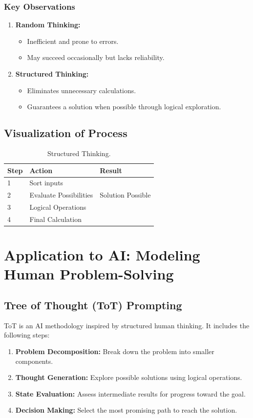 \documentclass[12pt, a4paper]{article}
\begin{document}
\subsubsection{Key Observations}
\begin{enumerate}
    \item \textbf{Random Thinking:}
    \begin{itemize}
        \item Inefficient and prone to errors.
        \item May succeed occasionally but lacks reliability.
    \end{itemize}
    \item \textbf{Structured Thinking:}\begin{itemize}
        \item Eliminates unnecessary calculations.
        \item Guarantees a solution when possible through logical exploration.
    \end{itemize}
\end{enumerate}
\subsection*{Visualization of Process}
\begin{table}[H]
\centering
\begin{tabular}{|l|l|l|}
\hline
Step & Action                 & Result            \\ \hline
1    & Sort inputs            &                   \\ \hline
2    & Evaluate Possibilities & Solution Possible \\ \hline
3    & Logical Operations     &                   \\ \hline
4    & Final Calculation      &                   \\ \hline
\end{tabular}
\caption{Structured Thinking.}
    \label{tab:Thinking procedure}
\end{table}
\section{Application to AI: Modeling Human Problem-Solving}
\subsection{Tree of Thought (ToT) Prompting}
ToT is an AI methodology inspired by structured human thinking. It includes the following steps:
\begin{enumerate}
    \item \textbf{Problem Decomposition:} Break down the problem into smaller components.
    \item \textbf{Thought Generation:} Explore possible solutions using logical operations.

    \item \textbf{State Evaluation:} Assess intermediate results for progress toward the goal.
    \item \textbf{Decision Making:} Select the most promising path to reach the solution.


\end{enumerate}
\end{document}
